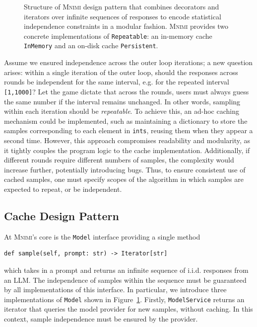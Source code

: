 \documentclass[sigconf]{acmart}
\newcommand{\projName}{\textsc{Mnimi}\xspace}
\begin{document}
\begin{figure}[htbp]
  \begin{center}
    
  \end{center} 
  \caption{Structure of \projName design pattern that combines decorators and iterators over infinite sequences of responses to encode statistical independence constraints in a modular fashion. \projName provides two concrete implementations of \texttt{Repeatable}: an in-memory cache \texttt{InMemory} and an on-disk cache \texttt{Persistent}.}
  \vspace{-2mm}
  \label{fig:structure}
\end{figure}


Assume we ensured independence across the outer loop iterations; a new question arises: within a single iteration of the outer loop, should the responses across rounds be independent for the same interval, e.g. for the repeated interval \texttt{[1,1000]}? Let the game dictate that across the rounds, users must always guess the same number if the interval remains unchanged. In other words, sampling within each iteration should be \emph{repeatable}. To achieve this, an ad-hoc caching mechanism could be implemented, such as maintaining a dictionary to store the samples corresponding to each element in \texttt{ints}, reusing them when they appear a second time. However, this approach compromises readability and modularity, as it tightly couples the program logic to the cache implementation. Additionally, if different rounds require different numbers of samples, the complexity would increase further, potentially introducing bugs. Thus, to ensure consistent use of cached samples, one must specify scopes of the algorithm in which samples are expected to repeat, or be independent.

\subsection{Cache Design Pattern}

At \projName's core is the \texttt{Model} interface providing a single method
\begin{lstlisting}[frame=none]
def sample(self, prompt: str) -> Iterator[str]
\end{lstlisting}
which takes in a prompt and returns an infinite sequence of i.i.d. responses from an LLM. The independence of samples within the sequence must be guaranteed by all implementations of this interface. In particular, we introduce three implementations of \texttt{Model} shown in Figure~\ref{fig:structure}. Firstly, \texttt{ModelService} returns an iterator that queries the model provider for new samples, without caching. In this context, sample independence must be ensured by the provider.
\end{document}
